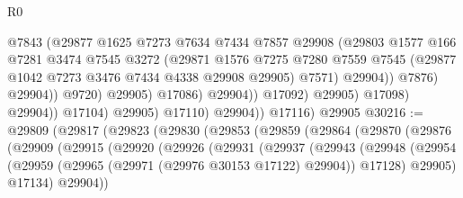 \begin{lexlean}{R0}
\begin{coremodule}
                                          @7843
                                          (@29877
                                            @1625
                                            @7273
                                            @7634
                                            @7434
                                            @7857
                                            @29908
                                            (@29803
                                              @1577
                                              @166
                                              @7281
                                              @3474
                                              @7545
                                              @3272
                                              (@29871
                                                @1576
                                                @7275
                                                @7280
                                                @7559
                                                @7545
                                                (@29877 @1042 @7273 @3476 @7434 @4338 @29908 @29905)
                                                @7571)
                                              @29904))
                                          @7876)
                                        @29904))
                                    @9720)
                                  @29905)
                                @17086)
                              @29904))
                          @17092)
                        @29905)
                      @17098)
                    @29904))
                @17104)
              @29905)
            @17110)
          @29904))
      @17116)
    @29905
@30216 := @29809
    (@29817
      (@29823
        (@29830
          (@29853
            (@29859
              (@29864
                (@29870
                  (@29876
                    (@29909
                      (@29915
                        (@29920
                          (@29926
                            (@29931
                              (@29937
                                (@29943
                                  (@29948
                                    (@29954
                                      (@29959
                                        (@29965 (@29971 (@29976 @30153 @17122) @29904))
                                        @17128)
                                      @29905)
                                    @17134)
                                  @29904))

\end{coremodule}
\end{lexlean}
